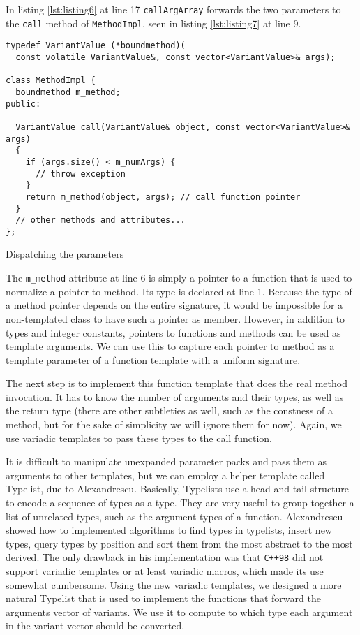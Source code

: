 In listing \ref{lst:listing6} at line 17 \texttt{callArgArray} forwards the two parameters to the \texttt{call} method of
\texttt{MethodImpl}, seen in listing \ref{lst:listing7} at line 9.

\begin{listing}[H]
\begin{verbatim}
typedef VariantValue (*boundmethod)(
  const volatile VariantValue&, const vector<VariantValue>& args);

class MethodImpl {
  boundmethod m_method;
public:

  VariantValue call(VariantValue& object, const vector<VariantValue>& args)
  {
    if (args.size() < m_numArgs) {
      // throw exception
    }
    return m_method(object, args); // call function pointer
  }
  // other methods and attributes...
};
\end{verbatim}
\caption{Dispatching the parameters}
\label{lst:listing7}
\end{listing}

The \texttt{m\_method} attribute at line 6 is simply a pointer to a function that is used to normalize a pointer to method.
Its type is declared at line 1. Because the type of a method pointer depends on the entire signature, it would be impossible
for a non-templated class to have such a pointer as member. However, in addition to types and integer constants, pointers to
functions and methods can be used as template arguments. We can use this to capture each pointer to method as a template
parameter of a function template with a uniform signature.

The next step is to implement this function template that does the real method invocation. It has to know the number of arguments
and their types, as well as the return type (there are other subtleties as well, such as the constness of a method,
but for the sake of simplicity we will ignore them for now). Again, we use variadic templates to pass these types to the call function.

It is difficult to manipulate unexpanded parameter packs and pass them as arguments to other templates, but we can employ a helper
template called Typelist, due to Alexandrescu\cite{alexbook}. Basically, Typelists use a head and tail structure to encode a sequence
of types as a type. They are very useful to group together a list of unrelated types, such as the argument types of a function.
Alexandrescu showed how to implemented algorithms to find types in typelists, insert new types, query types by position and sort
them from the most abstract to the most derived. The only drawback in his implementation was that \texttt{C++98} did not support
variadic templates or at least variadic macros, which made its use somewhat cumbersome. Using the new variadic templates, we designed
a more natural Typelist that is used to implement the functions that forward the arguments vector of variants. We use it to compute
to which type each argument in the variant vector should be converted.

